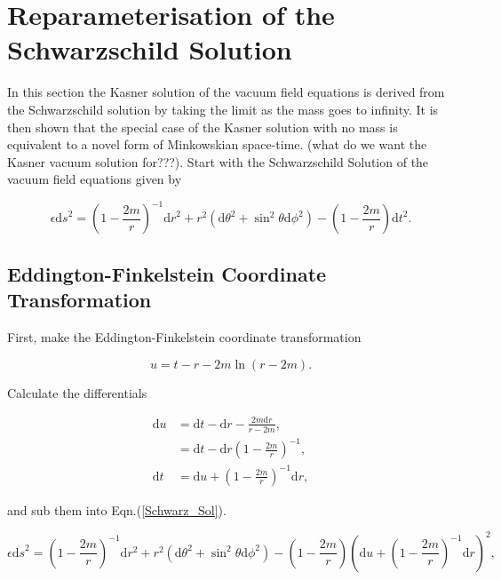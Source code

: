 \section{Reparameterisation of the Schwarzschild Solution}

In this section the Kasner solution of the vacuum field equations is derived from the Schwarzschild solution by taking the limit as the mass goes to infinity. It is then shown that the special case of the Kasner solution with no mass is equivalent to a novel form of Minkowskian space-time. (what do we want the Kasner vacuum solution for???). Start with the Schwarzschild Solution of the vacuum field equations given by

\begin{equation}\label{Schwarz_Sol} 
\epsilon {\mathrm{d}s}^2 = {\left(1 - \frac{2m}{r}\right)}^{-1} {\mathrm{d}r}^{2} + r^2 ({\mathrm{d}\theta}^2 + {{\sin}^2 \theta}{\mathrm{d} \phi}^2) - \left(1 - \frac{2m}{r}\right) {\mathrm{d}t}^2.
\end{equation}

\subsection{Eddington-Finkelstein Coordinate Transformation}

\noindent First, make the Eddington-Finkelstein coordinate transformation

\begin{equation}\label{Ed-Fin_trans}
u = t - r - 2m \ln(r - 2m).
\end{equation}

\noindent Calculate the differentials

\begin{align*}
\mathrm{d}u & = \mathrm{d}t - \mathrm{d}r - \frac{2m \mathrm{d}r}{r - 2m},\\
            & = \mathrm{d}t - \mathrm{d}r{\left( 1-\frac{2m}{r}  \right)}^{-1},\\
\mathrm{d}t & = \mathrm{d}u + {\left( 1-\frac{2m}{r}  \right)}^{-1} \mathrm{d}r, 
\end{align*}

\noindent and sub them into Eqn.(\ref{Schwarz_Sol}).

\begin{equation*}
\epsilon {\mathrm{d}s}^{2} = {\left( 1-\frac{2m}{r}  \right)}^{-1} \mathrm{d}r^2 + r^2 ({\mathrm{d}\theta}^2 + {{\sin}^2 \theta}{\mathrm{d} \phi}^2) - {\left( 1-\frac{2m}{r}  \right)} {\left( \mathrm{d}u + {\left( 1-\frac{2m}{r}  \right)}^{-1} \mathrm{d}r \right)}^{2},
\end{equation*}

